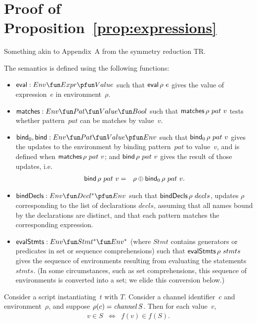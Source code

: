 \section{Proof of Proposition~\ref{prop:expressions}}
\label{sec:proof}

Something akin to Appendix~A from the symmetry reduction TR.

The semantics is defined using the following functions:
%
\begin{itemize}
\item $\eval : Env \fun Expr \pfun Value$ such that $\mathop{\sf eval} \rho~e$ gives the
  value of expression~$e$ in environment~$\rho$.

\item $\matches : Env \fun Pat \fun Value \fun Bool$ such that
  $\mathop{\sf matches} \rho~pat ~ v$ tests whether pattern~$pat$ can be matches by
  value~$v$.

\item $\bind_0, \bind : Env \fun Pat \fun Value \pfun Env$ such that
  $\mathop{\sf bind}\nolimits_0 \rho~pat~v$ gives the updates to the environment by binding
  pattern~$pat$ to value~$v$, and is defined when $\mathop{\sf matches} \rho~ pat~v$; and 
  $\mathop{\sf bind}\nolimits \rho~pat~v$ gives the result of those updates, i.e.
  \begin{eqnarray*}
  \mathop{\sf bind}\nolimits \rho~pat~v & = & \rho \oplus \mathop{\sf bind}\nolimits_0 \rho~pat~v.
  \end{eqnarray*}

\item $\bindDecls : Env \fun Decl^* \pfun Env$ such that
  $\mathop{\sf bindDecls} \rho~decls$, updates $\rho$ corresponding to the list of
  declarations $decls$, assuming that all names bound by the declarations are
  distinct, and that each pattern matches the corresponding expression.

\item $\evalStmts : Env \fun Stmt^* \fun Env^*$ (where $Stmt$ contains
  generators or predicates in set or sequence comprehensions) such that
  $\mathop{\sf evalStmts} \rho~stmts$ gives the sequence of environments resulting from
  evaluating the statements~$stmts$.  (In some circumstances, such as set
  comprehensions, this sequence of environments is converted into a set; we
  elide this conversion below.)
\end{itemize}


\begin{lemma}
Consider a script instantiating~$t$ with $T$.  Consider a channel
identifier~$c$ and environment~$\rho$, and suppose $\rho(c) = \mathop{\it channel} S$.
Then for each value~$v$,
\begin{eqnarray*}
v \in S & \iff & f(v) \in f(S).
\end{eqnarray*}
\end{lemma}

